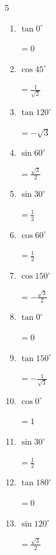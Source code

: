 \begin{multicols}{5}
\begin{enumerate}
        $\displaystyle =-\frac{\sqrt{3}}{2}$

  \item $\displaystyle \tan{0^\circ}$

        $\displaystyle =0$

  \item $\displaystyle \cos{45^\circ}$

        $\displaystyle =\frac{1}{\sqrt{2}}$

  \item $\displaystyle \tan{120^\circ}$

        $\displaystyle =-\sqrt{3}$

  \item $\displaystyle \sin{60^\circ}$

        $\displaystyle =\frac{\sqrt{3}}{2}$

  \item $\displaystyle \sin{30^\circ}$

        $\displaystyle =\frac{1}{2}$

  \item $\displaystyle \cos{60^\circ}$

        $\displaystyle =\frac{1}{2}$

  \item $\displaystyle \cos{150^\circ}$

        $\displaystyle =-\frac{\sqrt{3}}{2}$

  \item $\displaystyle \tan{0^\circ}$

        $\displaystyle =0$

  \item $\displaystyle \tan{150^\circ}$

        $\displaystyle =-\frac{1}{\sqrt{3}}$

  \item $\displaystyle \cos{0^\circ}$

        $\displaystyle =1$

  \item $\displaystyle \sin{30^\circ}$

        $\displaystyle =\frac{1}{2}$

  \item $\displaystyle \tan{180^\circ}$

        $\displaystyle =0$

  \item $\displaystyle \sin{120^\circ}$

        $\displaystyle =\frac{\sqrt{3}}{2}$


\end{enumerate}
\end{multicols}
